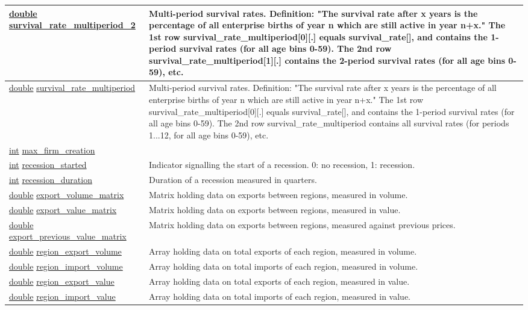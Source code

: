 \documentclass[a4paper,11pt]{article}
\begin{document}
\begin{landscape}
\begin{longtable}[H!]{ll}
\midrule
\url{double} \url{survival_rate_multiperiod_2} & \parbox{10cm}{Multi-period survival rates. Definition: "The survival rate after x years is the percentage of all enterprise births of year n which are still active in year n+x." The 1st row survival\_rate\_multiperiod[0][.] equals survival\_rate[], and contains the 1-period survival rates (for all age bins 0-59). The 2nd row survival\_rate\_multiperiod[1][.] contains the 2-period survival rates (for all age bins 0-59), etc.} \\
\midrule
\url{double} \url{survival_rate_multiperiod} & \parbox{10cm}{Multi-period survival rates. Definition: "The survival rate after x years is the percentage of all enterprise births of year n which are still active in year n+x." The 1st row survival\_rate\_multiperiod[0][.] equals survival\_rate[], and contains the 1-period survival rates (for all age bins 0-59). The 2nd row survival\_rate\_multiperiod contains all survival rates (for periods 1...12, for all age bins 0-59), etc.} \\
\midrule
\url{int} \url{max_firm_creation} & \parbox{10cm}{} \\
\midrule
\url{int} \url{recession_started} & \parbox{10cm}{Indicator signalling the start of a recession. 0: no recession, 1: recession.} \\
\midrule
\url{int} \url{recession_duration} & \parbox{10cm}{Duration of a recession measured in quarters.} \\
\midrule
\url{double} \url{export_volume_matrix} & \parbox{10cm}{Matrix holding data on exports between regions, measured in volume.} \\
\midrule
\url{double} \url{export_value_matrix} & \parbox{10cm}{Matrix holding data on exports between regions, measured in value.} \\
\midrule
\url{double} \url{export_previous_value_matrix} & \parbox{10cm}{Matrix holding data on exports between regions, measured against previous prices.} \\
\midrule
\url{double} \url{region_export_volume} & \parbox{10cm}{Array holding data on total exports of each region, measured in volume.} \\
\midrule
\url{double} \url{region_import_volume} & \parbox{10cm}{Array holding data on total imports of each region, measured in volume.} \\
\midrule
\url{double} \url{region_export_value} & \parbox{10cm}{Array holding data on total exports of each region, measured in value.} \\
\midrule
\url{double} \url{region_import_value} & \parbox{10cm}{Array holding data on total imports of each region, measured in value.} \\

\end{longtable}
\end{landscape}
\end{document}

